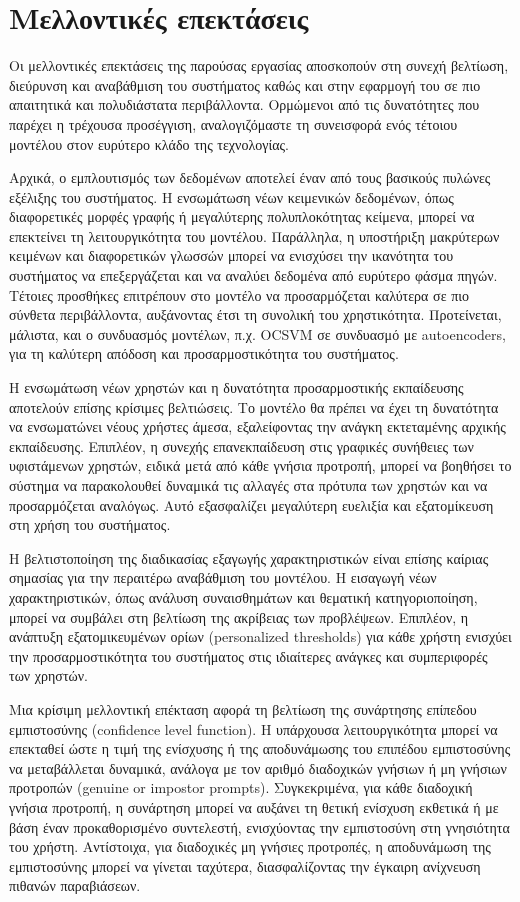 \chapter{Μελλοντικές επεκτάσεις}
\label{chapter:future_work}

Οι μελλοντικές επεκτάσεις της παρούσας εργασίας αποσκοπούν στη συνεχή βελτίωση, διεύρυνση και αναβάθμιση του συστήματος καθώς και στην εφαρμογή του σε πιο απαιτητικά και πολυδιάστατα περιβάλλοντα. Ορμώμενοι από τις δυνατότητες που παρέχει η τρέχουσα προσέγγιση, αναλογιζόμαστε τη συνεισφορά ενός τέτοιου μοντέλου στον ευρύτερο κλάδο της τεχνολογίας.

Αρχικά, ο εμπλουτισμός των δεδομένων αποτελεί έναν από τους βασικούς πυλώνες εξέλιξης του συστήματος. Η ενσωμάτωση νέων κειμενικών δεδομένων, όπως διαφορετικές μορφές γραφής ή μεγαλύτερης πολυπλοκότητας κείμενα, μπορεί να επεκτείνει τη λειτουργικότητα του μοντέλου. Παράλληλα, η υποστήριξη μακρύτερων κειμένων και διαφορετικών γλωσσών μπορεί να ενισχύσει την ικανότητα του συστήματος να επεξεργάζεται και να αναλύει δεδομένα από ευρύτερο φάσμα πηγών. Τέτοιες προσθήκες επιτρέπουν στο μοντέλο να προσαρμόζεται καλύτερα σε πιο σύνθετα περιβάλλοντα, αυξάνοντας έτσι τη συνολική του χρηστικότητα. Προτείνεται, μάλιστα, και ο συνδυασμός μοντέλων, π.χ. OCSVM σε συνδυασμό με autoencoders, για τη καλύτερη απόδοση και προσαρμοστικότητα του συστήματος.

Η ενσωμάτωση νέων χρηστών και η δυνατότητα προσαρμοστικής εκπαίδευσης αποτελούν επίσης κρίσιμες βελτιώσεις. Το μοντέλο θα πρέπει να έχει τη δυνατότητα να ενσωματώνει νέους χρήστες άμεσα, εξαλείφοντας την ανάγκη εκτεταμένης αρχικής εκπαίδευσης. Επιπλέον, η συνεχής επανεκπαίδευση στις γραφικές συνήθειες των υφιστάμενων χρηστών, ειδικά μετά από κάθε γνήσια προτροπή, μπορεί να βοηθήσει το σύστημα να παρακολουθεί δυναμικά τις αλλαγές στα πρότυπα των χρηστών και να προσαρμόζεται αναλόγως. Αυτό εξασφαλίζει μεγαλύτερη ευελιξία και εξατομίκευση στη χρήση του συστήματος. 

Η βελτιστοποίηση της διαδικασίας εξαγωγής χαρακτηριστικών είναι επίσης καίριας σημασίας για την περαιτέρω αναβάθμιση του μοντέλου. Η εισαγωγή νέων χαρακτηριστικών, όπως ανάλυση συναισθημάτων και θεματική κατηγοριοποίηση, μπορεί να συμβάλει στη βελτίωση της ακρίβειας των προβλέψεων. Επιπλέον, η ανάπτυξη εξατομικευμένων ορίων (personalized thresholds) για κάθε χρήστη ενισχύει την προσαρμοστικότητα του συστήματος στις ιδιαίτερες ανάγκες και συμπεριφορές των χρηστών.

Μια κρίσιμη μελλοντική επέκταση αφορά τη βελτίωση της συνάρτησης επίπεδου εμπιστοσύνης (confidence level function). Η υπάρχουσα λειτουργικότητα μπορεί να επεκταθεί ώστε η τιμή της ενίσχυσης ή της αποδυνάμωσης του επιπέδου εμπιστοσύνης να μεταβάλλεται δυναμικά, ανάλογα με τον αριθμό διαδοχικών γνήσιων ή μη γνήσιων προτροπών (genuine or impostor prompts). Συγκεκριμένα, για κάθε διαδοχική γνήσια προτροπή, η συνάρτηση μπορεί να αυξάνει τη θετική ενίσχυση εκθετικά ή με βάση έναν προκαθορισμένο συντελεστή, ενισχύοντας την εμπιστοσύνη στη γνησιότητα του χρήστη. Αντίστοιχα, για διαδοχικές μη γνήσιες προτροπές, η αποδυνάμωση της εμπιστοσύνης μπορεί να γίνεται ταχύτερα, διασφαλίζοντας την έγκαιρη ανίχνευση πιθανών παραβιάσεων.

